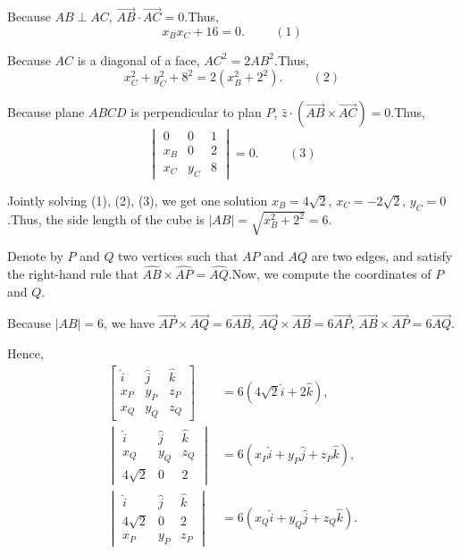 \begin{enumerate}
 Because $AB \perp AC$, $\overrightarrow{AB} \cdot \overrightarrow{AC} = 0$.Thus,
 \[ x_B x_C + 16 = 0 . \hspace{1cm} (1) \]

 Because $AC$ is a diagonal of a face, $AC^2 = 2 AB^2$.Thus,
 \[ x_C^2 + y_C^2 + 8^2 = 2 \left( x_B^2 + 2^2 \right) . \hspace{1cm} (2) \]

 Because plane $ABCD$ is perpendicular to plan $P$, $\hat z \cdot \left( \overrightarrow{AB} \times \overrightarrow{AC} \right) = 0$.Thus,
 \[ \begin{vmatrix} 0 & 0 & 1 \\ x_B & 0 & 2 \\ x_C & y_C & 8 \end{vmatrix} = 0 . \hspace{1cm} (3) \]

 Jointly solving (1), (2), (3), we get one solution $x_B = 4 \sqrt{2}$, $x_C = - 2 \sqrt{2}$, $y_C = 0$.Thus, the side length of the cube is $|AB| = \sqrt{x_B^2 + 2^2} = 6$.

 Denote by $P$ and $Q$ two vertices such that $AP$ and $AQ$ are two edges, and satisfy the right-hand rule that $\widehat{AB} \times \widehat{AP} = \widehat{AQ}$.Now, we compute the coordinates of $P$ and $Q$.

 Because $|AB| = 6$, we have $\overrightarrow{AP} \times \overrightarrow{AQ} = 6 \overrightarrow{AB}$, $\overrightarrow{AQ} \times \overrightarrow{AB} = 6 \overrightarrow{AP}$, $\overrightarrow{AB} \times \overrightarrow{AP} = 6 \overrightarrow{AQ}$.

 Hence,
 \begin{align*} \begin{bmatrix} \hat i & \hat j & \hat k \\ x_P & y_P & z_P \\ x_Q & y_Q & z_Q \end{bmatrix} & = 6 \left( 4 \sqrt{2} \hat i + 2 \hat k \right) , \\ \begin{vmatrix} \hat i & \hat j & \hat k \\ x_Q & y_Q & z_Q \\ 4 \sqrt{2} & 0 & 2 \end{vmatrix} & = 6 \left( x_P \hat i + y_P \hat j + z_P \hat k \right) , \\ \begin{vmatrix} \hat i & \hat j & \hat k \\ 4 \sqrt{2} & 0 & 2 \\ x_P & y_P & z_P \end{vmatrix} & = 6 \left( x_Q \hat i + y_Q \hat j + z_Q \hat k \right) . \end{align*}



\end{enumerate}
